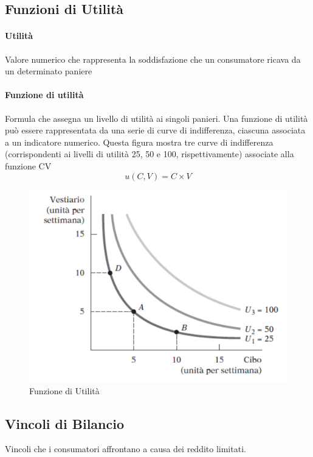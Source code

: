 \documentclass[12pt]{article}
\begin{document}
\subsection{Funzioni di Utilità}
\paragraph{Utilità} Valore numerico che rappresenta la soddisfazione che un consumatore ricava da un determinato paniere
\paragraph{Funzione di utilità} Formula che assegna un livello di utilità ai singoli panieri.
Una funzione di utilità può essere rappresentata da una serie di curve di
indifferenza, ciascuna associata a un indicatore numerico. Questa figura mostra tre curve di indifferenza (corrispondenti ai livelli di
utilità 25, 50 e 100, rispettivamente) associate alla funzione CV
$$u(C,V)=C \times V$$
\FloatBarrier
\begin{figure}[!htb]
    \centering
    \includegraphics[width=1\textwidth]{images/fUtil.png}
    \caption{Funzione di Utilità}
\end{figure}
\subsection{Vincoli di Bilancio}
Vincoli che i consumatori affrontano a causa dei reddito limitati.
\end{document}
